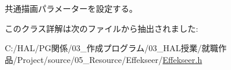 共通描画パラメーターを設定する。 



このクラス詳解は次のファイルから抽出されました\+:\begin{DoxyCompactItemize}
\item 
C\+:/\+H\+A\+L/\+P\+G関係/03\+\_\+作成プログラム/03\+\_\+\+H\+A\+L授業/就職作品/\+Project/source/05\+\_\+\+Resource/\+Effekseer/\mbox{\hyperlink{_effekseer_8h}{Effekseer.\+h}}\end{DoxyCompactItemize}
